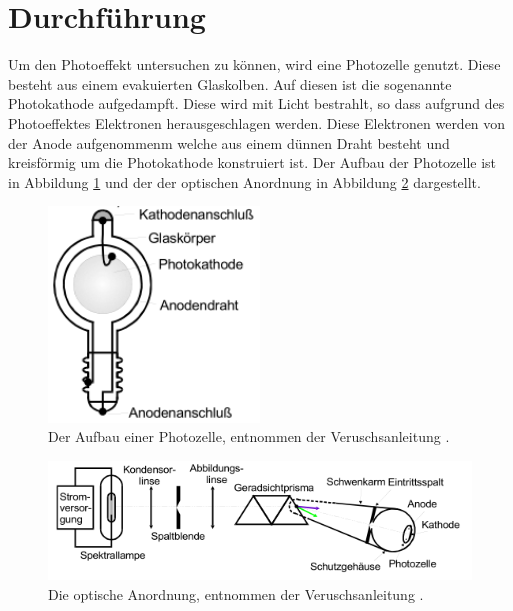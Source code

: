 \section{Durchführung}
\label{sec:Durchführung}

Um den Photoeffekt untersuchen zu können, wird eine Photozelle genutzt.
Diese besteht aus einem evakuierten Glaskolben.
Auf diesen ist die sogenannte Photokathode aufgedampft.
Diese wird mit Licht bestrahlt, so dass aufgrund des Photoeffektes Elektronen herausgeschlagen werden.
Diese Elektronen werden von der Anode aufgenommenm welche aus einem dünnen Draht besteht und kreisförmig um die Photokathode konstruiert ist.
Der Aufbau der Photozelle ist in Abbildung \ref{fig:Photozelle} und der der optischen Anordnung in Abbildung \ref{fig:Aufbau} dargestellt.

  \begin{figure}
    \centering
    \includegraphics[width=0.5\textwidth]{images/Photozelle.png}
    \caption{Der Aufbau einer Photozelle, entnommen der Veruschsanleitung \cite{sample}.}
    \label{fig:Photozelle}
  \end{figure}
  \begin{figure}
    \centering
    \includegraphics[width=1\linewidth]{images/Aufbau.png}
    \caption{Die optische Anordnung, entnommen der Veruschsanleitung \cite{sample}.}
    \label{fig:Aufbau}
  \end{figure}
